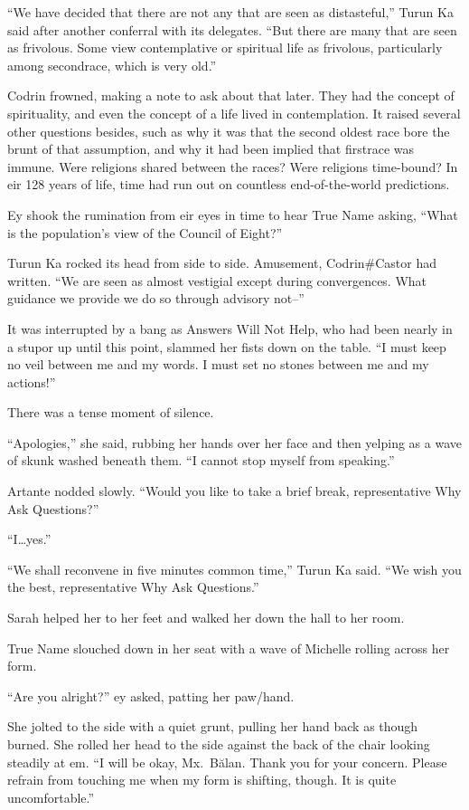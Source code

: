 ``We have decided that there are not any that are seen as distasteful,'' Turun Ka said after another conferral with its delegates. ``But there are many that are seen as frivolous. Some view contemplative or spiritual life as frivolous, particularly among secondrace, which is very old.''

Codrin frowned, making a note to ask about that later. They had the concept of spirituality, and even the concept of a life lived in contemplation. It raised several other questions besides, such as why it was that the second oldest race bore the brunt of that assumption, and why it had been implied that firstrace was immune. Were religions shared between the races? Were religions time-bound? In eir 128 years of life, time had run out on countless end-of-the-world predictions.

Ey shook the rumination from eir eyes in time to hear True Name asking, ``What is the population's view of the Council of Eight?''

Turun Ka rocked its head from side to side. Amusement, Codrin\#Castor had written. ``We are seen as almost vestigial except during convergences. What guidance we provide we do so through advisory not--''

It was interrupted by a bang as Answers Will Not Help, who had been nearly in a stupor up until this point, slammed her fists down on the table. ``I must keep no veil between me and my words. I must set no stones between me and my actions!''

There was a tense moment of silence.

``Apologies,'' she said, rubbing her hands over her face and then yelping as a wave of skunk washed beneath them. ``I cannot stop myself from speaking.''

Artante nodded slowly. ``Would you like to take a brief break, representative Why Ask Questions?''

``I\ldots yes.''

``We shall reconvene in five minutes common time,'' Turun Ka said. ``We wish you the best, representative Why Ask Questions.''

Sarah helped her to her feet and walked her down the hall to her room.

True Name slouched down in her seat with a wave of Michelle rolling across her form.

``Are you alright?'' ey asked, patting her paw/hand.

She jolted to the side with a quiet grunt, pulling her hand back as though burned. She rolled her head to the side against the back of the chair looking steadily at em. ``I will be okay, Mx.~Bălan. Thank you for your concern. Please refrain from touching me when my form is shifting, though. It is quite uncomfortable.''

